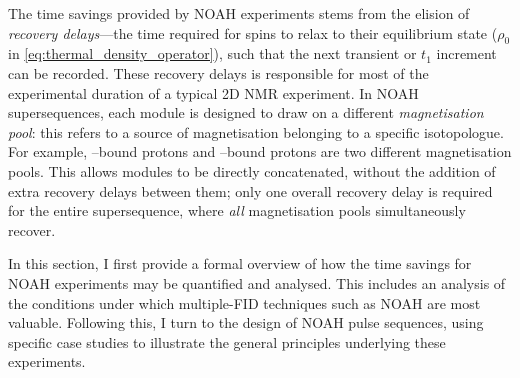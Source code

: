 The time savings provided by NOAH experiments stems from the elision of \textit{recovery delays}---the time required for spins to relax to their equilibrium state ($\rho_0$ in \cref{eq:thermal_density_operator}), such that the next transient or $t_1$ increment can be recorded.
These recovery delays is responsible for most of the experimental duration of a typical 2D NMR experiment.
In NOAH supersequences, each module is designed to draw on a different \textit{magnetisation pool}: this refers to a source of magnetisation belonging to a specific isotopologue.
For example, \carbon{}--bound protons and \carbont{}--bound protons are two different magnetisation pools.
This allows modules to be directly concatenated, without the addition of extra recovery delays between them; only one overall recovery delay is required for the entire supersequence, where \textit{all} magnetisation pools simultaneously recover.

In this section, I first provide a formal overview of how the time savings for NOAH experiments may be quantified and analysed.
This includes an analysis of the conditions under which multiple-FID techniques such as NOAH are most valuable.
Following this, I turn to the design of NOAH pulse sequences, using specific case studies to illustrate the general principles underlying these experiments.




